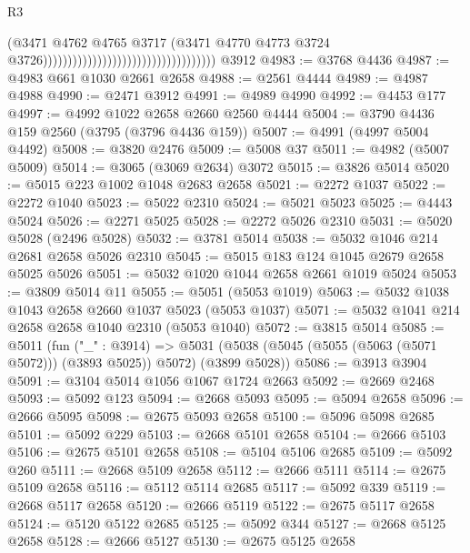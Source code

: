 \begin{lexlean}{R3}
\begin{coremodule}
                                                                      (@3471
                                                                        @4762
                                                                        @4765
                                                                        @3717
                                                                        (@3471
                                                                          @4770
                                                                          @4773
                                                                          @3724
                                                                          @3726)))))))))))))))))))))))))))))))))))
    @3912
@4983 := @3768 @4436
@4987 := @4983 @661 @1030 @2661 @2658
@4988 := @2561 @4444
@4989 := @4987 @4988
@4990 := @2471 @3912
@4991 := @4989 @4990
@4992 := @4453 @177
@4997 := @4992 @1022 @2658 @2660 @2560 @4444
@5004 := @3790 @4436 @159 @2560 (@3795 (@3796 @4436 @159))
@5007 := @4991 (@4997 @5004 @4492)
@5008 := @3820 @2476
@5009 := @5008 @37
@5011 := @4982 (@5007 @5009)
@5014 := @3065 (@3069 @2634) @3072
@5015 := @3826 @5014
@5020 := @5015 @223 @1002 @1048 @2683 @2658
@5021 := @2272 @1037
@5022 := @2272 @1040
@5023 := @5022 @2310
@5024 := @5021 @5023
@5025 := @4443 @5024
@5026 := @2271 @5025
@5028 := @2272 @5026 @2310
@5031 := @5020 @5028 (@2496 @5028)
@5032 := @3781 @5014
@5038 := @5032 @1046 @214 @2681 @2658 @5026 @2310
@5045 := @5015 @183 @124 @1045 @2679 @2658 @5025 @5026
@5051 := @5032 @1020 @1044 @2658 @2661 @1019 @5024
@5053 := @3809 @5014 @11
@5055 := @5051 (@5053 @1019)
@5063 := @5032 @1038 @1043 @2658 @2660 @1037 @5023 (@5053 @1037)
@5071 := @5032 @1041 @214 @2658 @2658 @1040 @2310 (@5053 @1040)
@5072 := @3815 @5014
@5085 := @5011
    (fun ("_" : @3914) =>
    @5031 (@5038 (@5045 (@5055 (@5063 (@5071 @5072))) (@3893 @5025)) @5072) (@3899 @5028))
@5086 := @3913 @3904
@5091 := @3104 @5014 @1056 @1067 @1724 @2663
@5092 := @2669 @2468
@5093 := @5092 @123
@5094 := @2668 @5093
@5095 := @5094 @2658
@5096 := @2666 @5095
@5098 := @2675 @5093 @2658
@5100 := @5096 @5098 @2685
@5101 := @5092 @229
@5103 := @2668 @5101 @2658
@5104 := @2666 @5103
@5106 := @2675 @5101 @2658
@5108 := @5104 @5106 @2685
@5109 := @5092 @260
@5111 := @2668 @5109 @2658
@5112 := @2666 @5111
@5114 := @2675 @5109 @2658
@5116 := @5112 @5114 @2685
@5117 := @5092 @339
@5119 := @2668 @5117 @2658
@5120 := @2666 @5119
@5122 := @2675 @5117 @2658
@5124 := @5120 @5122 @2685
@5125 := @5092 @344
@5127 := @2668 @5125 @2658
@5128 := @2666 @5127
@5130 := @2675 @5125 @2658

\end{coremodule}
\end{lexlean}
